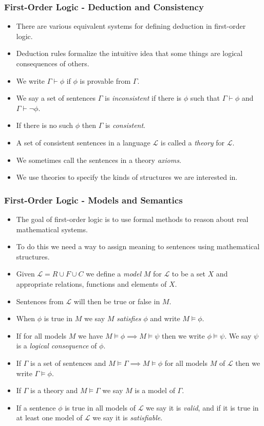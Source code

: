 \documentclass[handout]{beamer}
\begin{document}
\begin{frame}
\frametitle{First-Order Logic - Deduction and Consistency}
\begin{itemize}
\item There are various equivalent systems for defining deduction in first-order logic. 
\item Deduction rules formalize the intuitive idea that some things are logical consequences of others. 
\item We write $\Gamma\vdash \phi$ if $\phi$ is provable from $\Gamma$. 
\item We say a set of sentences $\Gamma$ is \emph{inconsistent} if there is $\phi$ such that $\Gamma\vdash \phi$ and $\Gamma\vdash \neg \phi$. 
\item If there is no such $\phi$ then $\Gamma$ is \emph{consistent}. 
\item A set of consistent sentences in a language $\mathscr{L}$ is called a \emph{theory} for $\mathscr{L}$. 
\item We sometimes call the sentences in a theory \emph{axioms}. 
\item We use theories to specify the kinds of structures we are interested in.
\end{itemize}

\end{frame}

\begin{frame}
\frametitle{First-Order Logic - Models and Semantics}
\begin{itemize}
\item The goal of first-order logic is to use formal methods to reason about real mathematical systems. 
\item To do this we need a way to assign meaning to sentences using mathematical structures. 
\item Given $\mathscr{L}=R\cup F\cup C$ we define a \emph{model} $M$ for $\mathscr{L}$ to be a set $X$ and appropriate relations, functions and elements of $X$. 
\item Sentences from $\mathscr{L}$ will then be true or false in $M$.
\item When $\phi$ is true in  $M$ we say $M$ \emph{satisfies} $\phi$ and write $M\models \phi$. 
\item If for all models $M$ we have $M\models \phi \implies M\models \psi$ then we write $\phi\models \psi$. We say $\psi$ is a \emph{logical consequence} of $\phi$. 
\item If $\Gamma$ is a set of sentences and $M\models\Gamma\implies M\models \phi$ for all models $M$ of $\mathscr{L}$ then we write $\Gamma\models \phi$. 
\item If $\Gamma$ is a theory and $M\models \Gamma$ we say $M$ is a model of $\Gamma$. 
\item If a sentence $\phi$ is true in all models of $\mathscr{L}$ we say it is \emph{valid}, and if it is true in at least one model of $\mathscr{L}$ we say it is \emph{satisfiable}. 
\end{itemize}
\end{frame}
\end{document}
